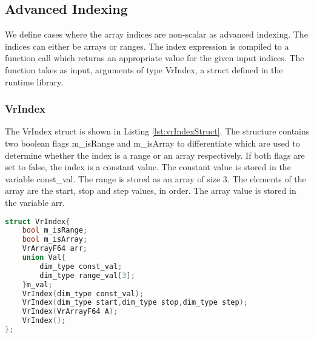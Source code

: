 \subsection{Advanced Indexing}
\label{subsec:advancedindexing}
We define cases where the array indices are non-scalar as advanced indexing. The indices can either be arrays or ranges. The index expression is compiled to a function call which returns an appropriate value for the given input indices. The function takes as input, arguments of type VrIndex, a struct defined in the runtime library.
\subsubsection{VrIndex}
\label{subsubsec:vrindex}
The VrIndex struct is shown in Listing \ref{lst:vrIndexStruct}. The structure contains two boolean flags m\_isRange and m\_isArray to differentiate which are used to determine whether the index is a range or an array respectively. If both flags are set to false, the index is a constant value. The constant value is stored in the variable const\_val. The range is stored as an array of size 3. The elements of the array are the start, stop and step values, in order. The array value is stored in the variable arr.
\begin{lstlisting}[language=c,caption={VrIndex Structure},label={lst:vrIndexStruct}]
struct VrIndex{ 
	bool m_isRange; 
	bool m_isArray; 
	VrArrayF64 arr;      
	union Val{ 
		dim_type const_val; 
		dim_type range_val[3]; 
	}m_val; 
	VrIndex(dim_type const_val);
	VrIndex(dim_type start,dim_type stop,dim_type step);
	VrIndex(VrArrayF64 A);
	VrIndex();
};
\end{lstlisting}
